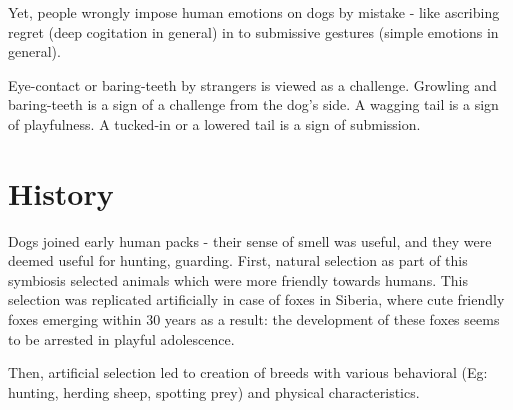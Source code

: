 \documentclass[oneside, article]{memoir}
\begin{document}
Yet, people wrongly impose human emotions on dogs by mistake - like ascribing regret (deep cogitation in general) in to submissive gestures (simple emotions in general).

Eye-contact or baring-teeth by strangers is viewed as a challenge. Growling and baring-teeth is a sign of a challenge from the dog's side. A wagging tail is a sign of playfulness. A tucked-in or a lowered tail is a sign of submission.

\section{History}
Dogs joined early human packs - their sense of smell was useful, and they were deemed useful for hunting, guarding. First, natural selection as part of this symbiosis selected animals which were more friendly towards humans. This selection was replicated artificially in case of foxes in Siberia, where cute friendly foxes emerging within 30 years as a result: the development of these foxes seems to be arrested in playful adolescence. 

Then, artificial selection led to creation of breeds with various behavioral (Eg: hunting, herding sheep, spotting prey) and physical characteristics.
\end{document}
